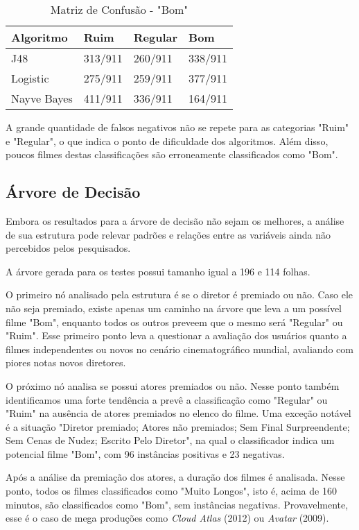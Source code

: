 \documentclass[twoside]{article}
\begin{document}
\begin{multicols}{2}
\begin{table}[H]
\caption{Matriz de Confusão - "Bom"}
\centering
\begin{tabular}{l|lll}
Algoritmo & Ruim & Regular & Bom\\
\midrule
J48 & 313/911 & 260/911 & 338/911\\
Logistic & 275/911 & 259/911 & 377/911\\
Nayve Bayes & 411/911 & 336/911 & 164/911\\
\bottomrule
\end{tabular}
\end{table}

A grande quantidade de falsos negativos não se repete para as categorias "Ruim" e "Regular", o que indica o ponto de dificuldade dos algoritmos. Além disso, poucos filmes destas classificações são erroneamente classificados como "Bom".

\subsection{Árvore de Decisão}

Embora os resultados para a árvore de decisão não sejam os melhores, a análise de sua estrutura pode relevar padrões e relações entre as variáveis ainda não percebidos pelos pesquisados.

A árvore gerada para os testes possui tamanho igual a 196 e 114 folhas.

O primeiro nó analisado pela estrutura é se o diretor é premiado ou não. Caso ele não seja premiado, existe apenas um caminho na árvore que leva a um possível filme "Bom", enquanto todos os outros preveem que o mesmo será "Regular" ou "Ruim". Esse primeiro ponto leva a questionar a avaliação dos usuários quanto a filmes independentes ou novos no cenário cinematográfico mundial, avaliando com piores notas novos diretores.

O próximo nó analisa se possui atores premiados ou não. Nesse ponto também identificamos uma forte tendência a prevê a classificação como "Regular" ou "Ruim" na ausência de atores premiados no elenco do filme. Uma exceção notável é a situação "Diretor premiado; Atores não premiados; Sem Final Surpreendente; Sem Cenas de Nudez; Escrito Pelo Diretor", na qual o classificador indica um potencial filme "Bom", com 96 instâncias positivas e 23 negativas. 

Após a análise da premiação dos atores, a duração dos filmes é analisada. Nesse ponto, todos os filmes classificados como "Muito Longos", isto é, acima de 160 minutos, são classificados como "Bom", sem instâncias negativas. Provavelmente, esse é o caso de mega produções como \textit{Cloud Atlas} (2012) ou \textit{Avatar} (2009).


\end{multicols}
\end{document}
